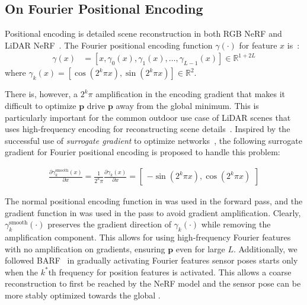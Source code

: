 \subsection{On Fourier Positional Encoding}
Positional encoding is  detailed scene reconstruction in both RGB NeRF and LiDAR NeRF~\cite{mildenhall2020nerfOG}. The Fourier positional encoding function $\gamma(\cdot)$ for feature $x$ is~\cite{tancik2020fourierfeatures}:
\begin{align}\label{eq:fourier_positional_encoding_0}
	\gamma(x) & = \left[x, \gamma_0(x), \gamma_1(x), \dots, \gamma_{L-1}(x)\right] \in \mathbb{R}^{1 + 2L}
\end{align}
where $\gamma_k(x) = \left[\cos\left(2^k \pi x\right), \sin\left(2^k \pi x\right)\right] \in \mathbb{R}^{2}$.

There is, however, a $2^k\pi$ amplification in the encoding gradient that makes it difficult to optimize $\mathbf{p}$  drive $\mathbf{p}$ away from the global minimum. This is particularly important for the common outdoor use case of LiDAR scenes that uses high-frequency encoding for reconstructing scene details~\cite{martinbrualla2021nerfinwild}. Inspired by the successful use of \textit{surrogate gradient} to optimize  networks~\cite{Zenke2021surrogate}, the following surrogate gradient for Fourier positional encoding is proposed to handle this problem:

\begin{align}\label{eq:surrogate_fourier_gradient}
	{\frac{\partial \gamma_k^\text{smooth}(x)}{\partial x}}
	= \frac{1}{2^k\pi} {\frac{\partial \gamma_k(x)}{\partial x}}  = \begin{bmatrix}
		- \sin(2^k \pi x) , \cos(2^k \pi x)
	\end{bmatrix}
\end{align}

The normal positional encoding function in  was used in the forward pass, and the gradient function in  was used in the  pass to avoid gradient amplification. Clearly, $\gamma^\text{smooth}_k(\cdot)$ preserves the gradient direction of $\gamma_k(\cdot)$ while removing the amplification component. This allows for using high-frequency Fourier features with no amplification on gradients, ensuring $\mathbf{p}$  even for large $L$.
Additionally, we followed BARF~\cite{lin2021barf} in gradually activating Fourier features sensor poses starts only when the $k^*$th frequency for position features is activated. This allows a coarse reconstruction to first be reached by the NeRF model\rev{,} and the sensor pose can  be more stably optimized towards the global .

